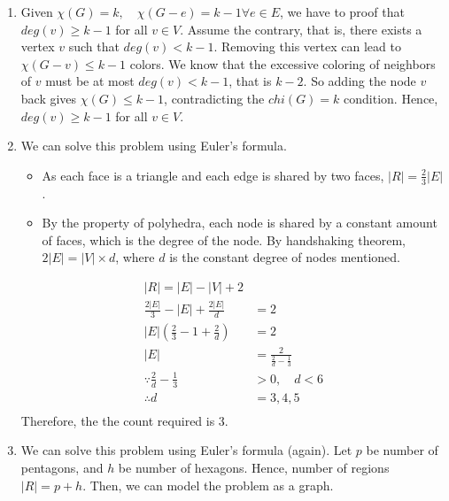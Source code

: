 \documentclass{article}
\begin{document}
\begin{enumerate}[label=(\alph*)]
    \item Given $\chi(G)=k,\quad \chi(G-e) = k-1 \forall e \in E$, we have to proof that $deg(v) \geq k-1$ for all $v \in V$. Assume the contrary, that is, there exists a vertex $v$ such that $deg(v) < k-1$. Removing this vertex can lead to $\chi(G-v) \leq k-1$ colors. We know that the excessive coloring of neighbors of $v$ must be at most $deg(v) < k-1$, that is $k-2$. So adding the node $v$ back gives $\chi(G) \leq k-1$, contradicting the $chi(G)=k$ condition. Hence, $deg(v) \geq k-1$ for all $v \in V$.
    \item We can solve this problem using Euler's formula.
          \begin{itemize}
              \item As each face is a triangle and each edge is shared by two faces, $|R| = \frac23 |E|$.
              \item By the property of polyhedra, each node is shared by a constant amount of faces, which is the degree of the node. By handshaking theorem, $2|E| = |V| \times d$, where $d$ is the constant degree of nodes mentioned.
          \end{itemize}
          \begin{align*}
              |R| = |E| - |V| + 2                                                           \\
              \frac{2|E|}{3} - |E| + \frac{2|E|}{d} & = 2                                   \\
              |E|(\frac{2}{3} - 1 + \frac{2}{d})    & = 2                                   \\
              |E|                                   & = \frac{2}{\frac{2}{d} - \frac{1}{3}} \\
              \because \frac{2}{d} - \frac{1}{3}    & > 0,\quad d < 6                       \\
              \therefore d                          & = 3,4,5                               \\
          \end{align*}
          Therefore, the the count required is 3.
    \item We can solve this problem using Euler's formula (again). Let $p$ be number of pentagons, and $h$ be number of hexagons. Hence, number of regions $|R| = p + h$. Then, we can model the problem as a graph.


\end{enumerate}
\end{document}
